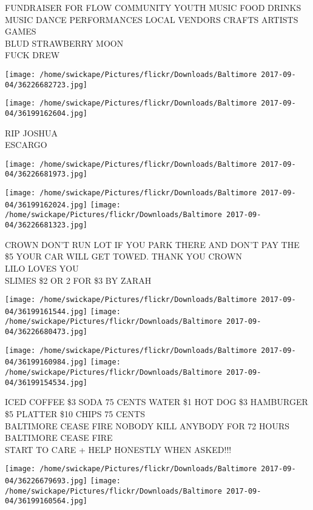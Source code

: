 \documentclass[10pt,letterpaper]{article}
\begin{document}
FUNDRAISER FOR FLOW COMMUNITY YOUTH MUSIC FOOD DRINKS MUSIC DANCE PERFORMANCES LOCAL VENDORS CRAFTS ARTISTS GAMES\\
BLUD STRAWBERRY MOON\\
FUCK DREW
\pagebreak

\texttt{[image: /home/swickape/Pictures/flickr/Downloads/Baltimore 2017-09-04/36226682723.jpg]}

\vspace{0.25in}
\texttt{[image: /home/swickape/Pictures/flickr/Downloads/Baltimore 2017-09-04/36199162604.jpg]}

RIP JOSHUA\\
ESCARGO
\pagebreak

\texttt{[image: /home/swickape/Pictures/flickr/Downloads/Baltimore 2017-09-04/36226681973.jpg]}

\vspace{0.25in}
\texttt{[image: /home/swickape/Pictures/flickr/Downloads/Baltimore 2017-09-04/36199162024.jpg]}
\texttt{[image: /home/swickape/Pictures/flickr/Downloads/Baltimore 2017-09-04/36226681323.jpg]}

CROWN DON'T RUN LOT IF YOU PARK THERE AND DON'T PAY THE \$5 YOUR CAR WILL GET TOWED.  THANK YOU CROWN\\
LILO LOVES YOU\\
SLIMES \$2 OR 2 FOR \$3 BY ZARAH
\pagebreak

\texttt{[image: /home/swickape/Pictures/flickr/Downloads/Baltimore 2017-09-04/36199161544.jpg]}
\texttt{[image: /home/swickape/Pictures/flickr/Downloads/Baltimore 2017-09-04/36226680473.jpg]}

\texttt{[image: /home/swickape/Pictures/flickr/Downloads/Baltimore 2017-09-04/36199160984.jpg]}
\texttt{[image: /home/swickape/Pictures/flickr/Downloads/Baltimore 2017-09-04/36199154534.jpg]}

ICED COFFEE \$3 SODA 75 CENTS WATER \$1 HOT DOG \$3 HAMBURGER \$5 PLATTER \$10 CHIPS 75 CENTS\\
BALTIMORE CEASE FIRE NOBODY KILL ANYBODY FOR 72 HOURS\\
BALTIMORE CEASE FIRE\\
START TO CARE + HELP HONESTLY WHEN ASKED!!!
\pagebreak

\texttt{[image: /home/swickape/Pictures/flickr/Downloads/Baltimore 2017-09-04/36226679693.jpg]}
\texttt{[image: /home/swickape/Pictures/flickr/Downloads/Baltimore 2017-09-04/36199160564.jpg]}
\end{document}
